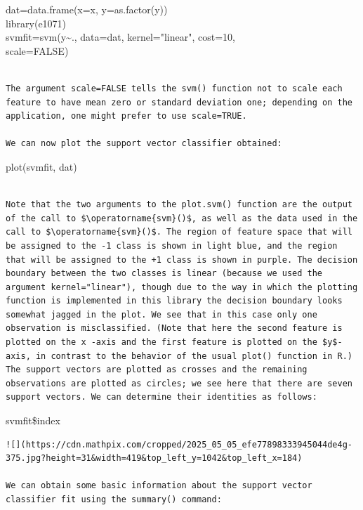 \documentclass[10pt]{article}
\begin{document}
\begin{displayquote}
dat=data.frame(x=x, y=as.factor(y))\\
library(e1071)\\
svmfit=svm(y\~{}., data=dat, kernel="linear", cost=10,\\
scale=FALSE)
\end{displayquote}

\begin{verbatim}

The argument scale=FALSE tells the svm() function not to scale each feature to have mean zero or standard deviation one; depending on the application, one might prefer to use scale=TRUE.

We can now plot the support vector classifier obtained:
\end{verbatim}

\begin{displayquote}
plot(svmfit, dat)
\end{displayquote}

\begin{verbatim}

Note that the two arguments to the plot.svm() function are the output of the call to $\operatorname{svm}()$, as well as the data used in the call to $\operatorname{svm}()$. The region of feature space that will be assigned to the -1 class is shown in light blue, and the region that will be assigned to the +1 class is shown in purple. The decision boundary between the two classes is linear (because we used the argument kernel="linear"), though due to the way in which the plotting function is implemented in this library the decision boundary looks somewhat jagged in the plot. We see that in this case only one observation is misclassified. (Note that here the second feature is plotted on the x -axis and the first feature is plotted on the $y$-axis, in contrast to the behavior of the usual plot() function in R.) The support vectors are plotted as crosses and the remaining observations are plotted as circles; we see here that there are seven support vectors. We can determine their identities as follows:
\end{verbatim}

\begin{displayquote}
svmfit\$index
\end{displayquote}

\begin{verbatim}
![](https://cdn.mathpix.com/cropped/2025_05_05_efe77898333945044de4g-375.jpg?height=31&width=419&top_left_y=1042&top_left_x=184)

We can obtain some basic information about the support vector classifier fit using the summary() command:
\end{verbatim}
\end{document}
